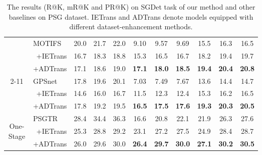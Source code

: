 \documentclass[letterpaper]{article} %
\begin{document}
\begin{table}[]
\begin{tabular}{cr|ccccccccc}
\multicolumn{1}{c|}{}                            & \multicolumn{1}{l|}{MOTIFS \cite{Zellers_2018_CVPR}}    & 20.0 & 21.7 & \multicolumn{1}{c|}{22.0}  & 9.10          & 9.57          & \multicolumn{1}{c|}{9.69}          & 15.5          & 16.3          & 16.5          \\
\multicolumn{1}{c|}{}                            & \quad +IETrans \cite{zhang2022fine}                      & 16.7 & 18.3 & \multicolumn{1}{c|}{18.8}  & 15.3          & 16.5          & \multicolumn{1}{c|}{16.7}          & 18.2          & 19.4          & 19.7          \\
\multicolumn{1}{c|}{}                            & \multicolumn{1}{l|}{\quad +ADTrans }                        & 17.1 & 18.6 & \multicolumn{1}{c|}{19.0}  & \textbf{17.1} & \textbf{18.0} & \multicolumn{1}{c|}{\textbf{18.5}} & \textbf{19.4} & \textbf{20.4} & \textbf{20.8} \\ \cline{2-11}
\multicolumn{1}{c|}{}                            & \multicolumn{1}{l|}{GPSnet \cite{Lin_2020_CVPR}}    & 17.8 & 19.6 & \multicolumn{1}{c|}{20.1}  & 7.03          & 7.49          & \multicolumn{1}{c|}{7.67}          & 13.6          & 14.4          & 14.7          \\
\multicolumn{1}{c|}{}                            & \quad +IETrans \cite{zhang2022fine}                      & 14.6 & 16.0 & \multicolumn{1}{c|}{16.7}  & 11.5          & 12.3          & \multicolumn{1}{c|}{12.4}          & 15.3          & 16.2          & 16.5          \\
\multicolumn{1}{c|}{}                            & \multicolumn{1}{l|}{\quad +ADTrans }                        & 17.8 & 19.2 & \multicolumn{1}{c|}{19.5}  & \textbf{16.5} & \textbf{17.5} & \multicolumn{1}{c|}{\textbf{17.6}} & \textbf{19.3} & \textbf{20.3} & \textbf{20.5} \\ \hline
\multicolumn{1}{c|}{\multirow{3}{*}{One-Stage}}
& \multicolumn{1}{l|}{PSGTR \cite{yang2022psg}}     & 28.4 & 34.4 & \multicolumn{1}{c|}{36.3}  & 16.6          & 20.8          & \multicolumn{1}{c|}{22.1}          & 21.9          & 26.3          & 27.6          \\
\multicolumn{1}{c|}{}                            & \quad +IETrans \cite{zhang2022fine}                      & 25.3 & 28.8 & \multicolumn{1}{c|}{29.2}  & 23.1          & 27.2          & \multicolumn{1}{c|}{27.5}          & 24.9          & 28.4          & 28.7          \\
\multicolumn{1}{c|}{}                            & \multicolumn{1}{l|}{\quad +ADTrans }                          & 26.0 & 29.6 & \multicolumn{1}{c|}{30.0}  & \textbf{26.4} & \textbf{29.7} & \multicolumn{1}{c|}{\textbf{30.0}} & \textbf{27.1} & \textbf{30.2} & \textbf{30.5} \\ \hline
\end{tabular}
\label{main}
\caption{The results (R@K, mR@K and PR@K) on SGDet task of our method and other baselines on PSG dataset. IETrans and ADTrans denote models equipped with different dataset-enhancement methods. }
\end{table}
\end{document}
